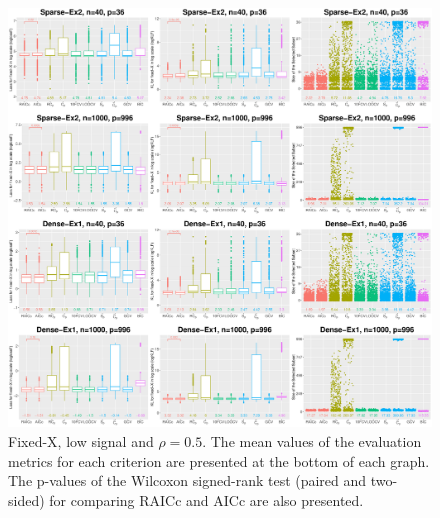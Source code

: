 \begin{figure}[!ht]
  \centering
  \includegraphics[width=\textwidth]{figures/main/fixedx/subset_selection/largep_lsnr.eps}
  \caption{Fixed-X, low signal and $\rho=0.5$. The mean values of the evaluation metrics for each criterion are presented at the bottom of each graph. The p-values of the Wilcoxon signed-rank test (paired and two-sided) for comparing RAICc and AICc are also presented.}
  \label{fig:subsetselection_fixedx_lsnr_largep}
\end{figure}

